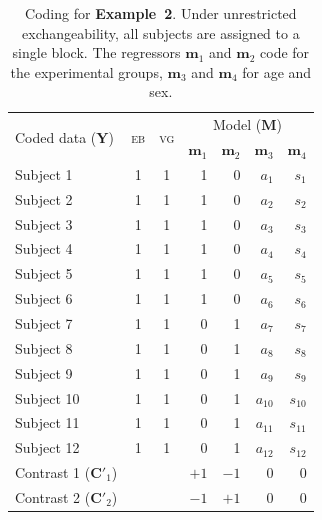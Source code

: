 \begin{table}[!t]
\caption[Coding for Example 2]{Coding for \textbf{Example~2}. Under unrestricted exchangeability, all subjects are assigned to a single block. The regressors $\mathbf{m}_1$ and $\mathbf{m}_2$ code for the experimental groups, $\mathbf{m}_3$ and $\mathbf{m}_4$ for age and sex.}
\begin{center}
{\small
\begin{tabular}{@{}lccrrrr@{}}
\toprule
\multirow{2}{*}{\vspace*{-1.7mm}Coded data ($\mathbf{Y}$)} & \multirow{2}{*}{\vspace*{-1.7mm}\textsc{eb}} & \multirow{2}{*}{\vspace*{-1.7mm}\textsc{vg}} & \multicolumn{4}{c}{Model ($\mathbf{M}$)\hspace*{-3mm}}\\
\cmidrule(l){4-7}
& & & $\mathbf{m}_1$ & $\mathbf{m}_2$ & $\mathbf{m}_3$ & $\mathbf{m}_4$\\
\midrule
Subject 1   & 1 & 1 & 1 & 0 & $a_{1}$  & $s_{1}$\\
Subject 2   & 1 & 1 & 1 & 0 & $a_{2}$  & $s_{2}$\\
Subject 3   & 1 & 1 & 1 & 0 & $a_{3}$  & $s_{3}$\\
Subject 4   & 1 & 1 & 1 & 0 & $a_{4}$  & $s_{4}$\\
Subject 5   & 1 & 1 & 1 & 0 & $a_{5}$  & $s_{5}$\\
Subject 6   & 1 & 1 & 1 & 0 & $a_{6}$  & $s_{6}$\\
Subject 7   & 1 & 1 & 0 & 1 & $a_{7}$  & $s_{7}$\\
Subject 8   & 1 & 1 & 0 & 1 & $a_{8}$  & $s_{8}$\\
Subject 9   & 1 & 1 & 0 & 1 & $a_{9}$  & $s_{9}$\\
Subject 10  & 1 & 1 & 0 & 1 & $a_{10}$ & $s_{10}$\\
Subject 11  & 1 & 1 & 0 & 1 & $a_{11}$ & $s_{11}$\\
Subject 12  & 1 & 1 & 0 & 1 & $a_{12}$ & $s_{12}$\\
\midrule
Contrast 1 ($\mathbf{C}'_1$) & & & $+1$ & $-1$ & 0 & 0\\
Contrast 2 ($\mathbf{C}'_2$) & & & $-1$ & $+1$ & 0 & 0\\
\bottomrule
\end{tabular}}
\end{center}
\label{tab:ex_multipleregression}
\end{table}

